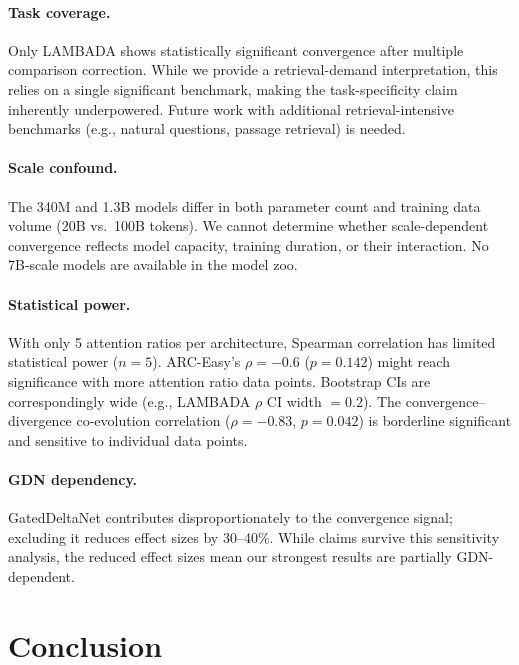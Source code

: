 \documentclass[11pt,a4paper]{article}
\begin{document}
\paragraph{Task coverage.}
Only LAMBADA shows statistically significant convergence after multiple comparison correction. While we provide a retrieval-demand interpretation, this relies on a single significant benchmark, making the task-specificity claim inherently underpowered. Future work with additional retrieval-intensive benchmarks (e.g., natural questions, passage retrieval) is needed.

\paragraph{Scale confound.}
The 340M and 1.3B models differ in both parameter count and training data volume (20B vs.\ 100B tokens). We cannot determine whether scale-dependent convergence reflects model capacity, training duration, or their interaction. No 7B-scale models are available in the model zoo.

\paragraph{Statistical power.}
With only 5 attention ratios per architecture, Spearman correlation has limited statistical power ($n{=}5$). ARC-Easy's $\rho{=}{-}0.6$ ($p{=}0.142$) might reach significance with more attention ratio data points. Bootstrap CIs are correspondingly wide (e.g., LAMBADA $\rho$ CI width $= 0.2$). The convergence--divergence co-evolution correlation ($\rho{=}{-}0.83$, $p{=}0.042$) is borderline significant and sensitive to individual data points.

\paragraph{GDN dependency.}
GatedDeltaNet contributes disproportionately to the convergence signal; excluding it reduces effect sizes by 30--40\%. While claims survive this sensitivity analysis, the reduced effect sizes mean our strongest results are partially GDN-dependent.

\section{Conclusion}
\end{document}
